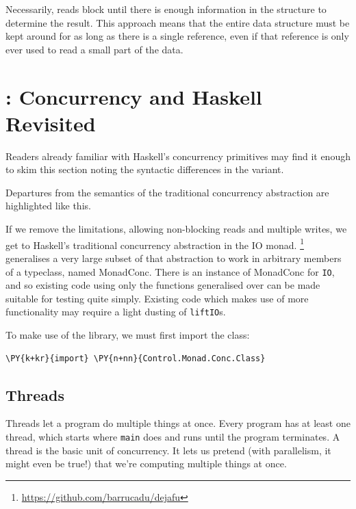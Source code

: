 Necessarily, reads block until there is enough information in the
structure to determine the result. This approach means that the entire
data structure must be kept around for as long as there is a single
reference, even if that reference is only ever used to read a small
part of the data.

\section{\dejafu{}: Concurrency and Haskell Revisited}
\label{sec:dejafu-conc}

Readers already familiar with Haskell's concurrency primitives may
find it enough to skim this section noting the syntactic differences
in the \dejafu{} variant.

\begin{departure}
  Departures from the semantics of the traditional concurrency
  abstraction are highlighted like this.
\end{departure}

If we remove the limitations, allowing non-blocking reads and multiple
writes, we get to Haskell's traditional concurrency abstraction in the
IO
monad. \dejafu{}\footnote{\url{https://github.com/barrucadu/dejafu}}
generalises a very large subset of that abstraction to work in
arbitrary members of a typeclass, named MonadConc. There is an
instance of MonadConc for \texttt{IO}, and so existing code using only
the functions generalised over can be made suitable for testing quite
simply. Existing code which makes use of more functionality may
require a light dusting of \texttt{liftIO}s.

To make use of the \dejafu{} library, we must first import the class:


\begin{Verbatim}[commandchars=\\\{\}]
\PY{k+kr}{import} \PY{n+nn}{Control.Monad.Conc.Class}
\end{Verbatim}

\subsection*{Threads}
\label{sec:dejafu-conc-threads}

Threads let a program do multiple things at once. Every program has at
least one thread, which starts where \texttt{main} does and runs until
the program terminates. A thread is the basic unit of concurrency. It
lets us pretend (with parallelism, it might even be true!) that we're
computing multiple things at once.

